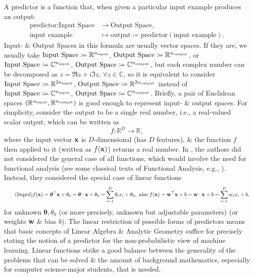 \documentclass{article}
\begin{document}
A predictor is a function that, when given a particular input example produces an output:
\begin{align*}
	\mbox{predictor}:\mbox{Input Space}&\to\mbox{Output Space},\\
	\mbox{input example}&\mapsto\mbox{output}\coloneqq\mbox{predictor}(\mbox{input example}).
\end{align*}
Input- \& Output Spaces in this formula are usually vector spaces. If they are, we usually take $\mbox{Input Space}\coloneqq\mathbb{R}^{n_{\rm input}}$, $\mbox{Output Space}\coloneqq\mathbb{R}^{n_{\rm output}}$, or $\mbox{Input Space}\coloneqq\mathbb{C}^{n_{\rm input}}$, $\mbox{Output Space}\coloneqq\mathbb{C}^{n_{\rm output}}$, but each complex number can be decomposed as $z = \Re z + i\Im z$, $\forall z\in\mathbb{C}$, so it is equivalent to consider $\mbox{Input Space}\coloneqq\mathbb{R}^{2n_{\rm input}}$, $\mbox{Output Space}\coloneqq\mathbb{R}^{2n_{\rm output}}$ instead of $\mbox{Input Space}\coloneqq\mathbb{C}^{n_{\rm input}}$, $\mbox{Output Space}\coloneqq\mathbb{C}^{n_{\rm output}}$. Briefly, a pair of Euclidean spaces $(\mathbb{R}^{n_{\rm input}},\mathbb{R}^{n_{\rm output}})$ is good enough to represent input- \& output spaces. For simplicity, consider the output to be a single real number, i.e., a real-valued scalar output, which can be written as
\begin{equation*}
	f:\mathbb{R}^D\to\mathbb{R},
\end{equation*}
where the input vector ${\bf x}$ is $D$-dimensional (has $D$ features), \& the function $f$ then applied to it (written as $f({\bf x})$) returns a real number. In \cite{Deisenroth_Faisal_Ong2024}, the authors did not considered the general case of all functions, which would involve the need for functional analysis (see some classical texts of Functional Analysis, e.g., \cite{Alt2016,Brezis2011,Rudin1991}). Instead, they considered the special case of linear functions
\begin{equation}
	\label{linear predictor}
	\tag{linprd}
	f({\bf x}) = \boldsymbol{\theta}^\top{\bf x} + \theta_0 = \boldsymbol{\theta}\cdot{\bf x} + \theta_0 = \sum_{i=1}^D \theta_ix_i + \theta_0,\mbox{ also } f({\bf x}) = {\bf w}^\top{\bf x} + b = {\bf w}\cdot{\bf x} + b = \sum_{i=1}^D w_ix_i + b,
\end{equation}
for unknown $\boldsymbol{\theta},\theta_0$ (or more precisely, unknown but adjustable parameters) (or weights ${\bf w}$ \& bias $b$). The linear restriction of possible forms of predictors means that basic concepts of Linear Algebra \& Analytic Geometry suffice for precisely stating the notion of a predictor for the non-probabilistic view of machine learning. Linear functions strike a good balance between the generality of the problems that can be solved \& the amount of background mathematics, especially for computer science-major students, that is needed.
\end{document}
